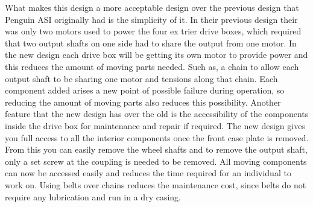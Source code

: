 What makes this design a more acceptable design over the previous design that Penguin ASI originally had is the simplicity of it. In their previous design their was only two motors used to power the four ex trier drive boxes, which required that two output shafts on one side had to share the output from one motor. In the new design each drive box will be getting its own motor to provide power and this reduces the amount of moving parts needed. Such as, a chain to allow each output shaft to be sharing one motor and tensions along that chain. Each component added arises a new point of possible failure during operation, so reducing the amount of moving parts also reduces this possibility. Another feature that the new design has over the old is the accessibility of the components inside the drive box for maintenance and repair if required. The new design gives you full access to all the interior components once the front case plate is removed. From this you can easily remove the wheel shafts and to remove the output shaft, only a set screw at the coupling is needed to be removed. All moving components can now be accessed easily and reduces the time required for an individual to work on. Using belts over chains reduces the maintenance cost, since belts do not require any lubrication and run in a dry casing.


